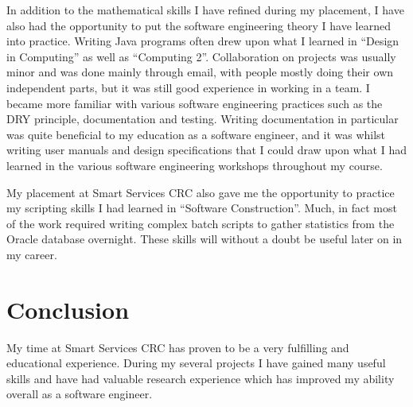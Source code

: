 \documentclass{report}
\begin{document}
In addition to the mathematical skills I have refined during my placement, I have also had the opportunity to put the software engineering theory I have learned into practice. Writing Java programs often drew upon what I learned in ``Design in Computing'' as well as ``Computing 2''. Collaboration on projects was usually minor and was done mainly through email, with people mostly doing their own independent parts, but it was still good experience in working in a team. I became more familiar with various software engineering practices such as the DRY principle, documentation and testing. Writing documentation in particular was quite beneficial to my education as a software engineer, and it was whilst writing user manuals and design specifications that I could draw upon what I had learned in the various software engineering workshops throughout my course.

My placement at Smart Services CRC also gave me the opportunity to practice my scripting skills I had learned in ``Software Construction''. Much, in fact most of the work required writing complex batch scripts to gather statistics from the Oracle database overnight. These skills will without a doubt be useful later on in my career.


\chapter{Conclusion}
My time at Smart Services CRC has proven to be a very fulfilling and educational experience. During my several projects I have gained many useful skills and have had valuable research experience which has improved my ability overall as a software engineer.
\end{document}
